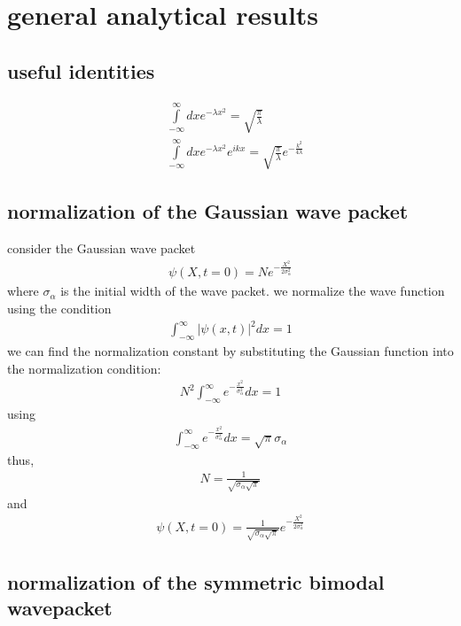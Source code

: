\section{general analytical results}

\subsection{useful identities}
\begin{align}
    & \int\limits_{-\infty}^{\infty}dx e^{-\lambda x^2} = \sqrt{\frac{\pi}{\lambda}}\label{eq:app-gaussian-integral}                                     \\
    & \int\limits_{-\infty}^{\infty}dx  e^{-\lambda x^2} e^{ikx}  = \sqrt{\frac{\pi}{\lambda}} e^{-\frac{k^2}{4\lambda}}\label{eq:app-gaussian-fourier-integral}
\end{align}

\subsection{normalization of the Gaussian wave packet}\label{sec:app-gaussian-normalization}

consider the Gaussian wave packet
\begin{align}
    \psi(X,t=0) = N e^{-\frac{X^2}{2\sigma_\alpha^2}}
\end{align}
where $\sigma_\alpha$ is the initial width of the wave packet. we normalize the wave function using the condition
\begin{align}
    \int_{-\infty}^{\infty} |\psi(x,t)|^2 dx = 1
\end{align}
we can find the normalization constant by substituting the Gaussian function into the normalization condition:
\begin{align}
    N^2 \int_{-\infty}^{\infty} e^{-\frac{x^2}{\sigma_\alpha^2}} dx = 1
\end{align}
using
\begin{align}
    \int_{-\infty}^{\infty} e^{-\frac{x^2}{\sigma_\alpha^2}} dx = \sqrt{\pi}\sigma_\alpha
\end{align}
thus,
\begin{align}
    N = \frac{1}{\sqrt{\sigma_\alpha\sqrt{\pi}}}
\end{align}
and
\begin{align}
    \psi(X,t=0) = \frac{1}{\sqrt{\sigma_\alpha\sqrt{\pi}}}e^{-\frac{X^2}{2\sigma_\alpha^2}}
\end{align}

\subsection{normalization of the symmetric bimodal wavepacket}\label{sec:app-bimodal-normalization}

